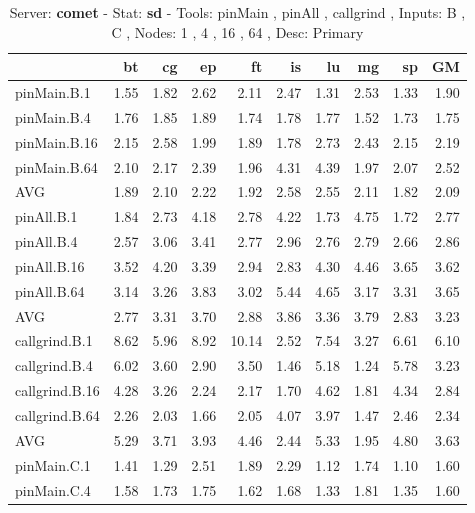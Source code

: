 \begin{table*}[]
\caption{Server: \textbf{comet} - 
 Stat: \textbf{sd} - 
 Tools: pinMain , pinAll , callgrind ,  
 Inputs: B , C ,  
 Nodes: 1 , 4 , 16 , 64 ,  
 Desc: Primary}
\label{comet_sd_pMpAcg_BC_itn_p3.5}\begin{center}
\begin{tabular}{lrrrrrrrrr}
\hline
                &   bt &   cg &    ep &    ft &   is &   lu &   mg &   sp &   GM \\
\hline
 pinMain.B.1    & 1.55 & 1.82 &  2.62 &  2.11 & 2.47 & 1.31 & 2.53 & 1.33 & 1.90 \\
 pinMain.B.4    & 1.76 & 1.85 &  1.89 &  1.74 & 1.78 & 1.77 & 1.52 & 1.73 & 1.75 \\
 pinMain.B.16   & 2.15 & 2.58 &  1.99 &  1.89 & 1.78 & 2.73 & 2.43 & 2.15 & 2.19 \\
 pinMain.B.64   & 2.10 & 2.17 &  2.39 &  1.96 & 4.31 & 4.39 & 1.97 & 2.07 & 2.52 \\
 AVG            & 1.89 & 2.10 &  2.22 &  1.92 & 2.58 & 2.55 & 2.11 & 1.82 & 2.09 \\
 pinAll.B.1     & 1.84 & 2.73 &  4.18 &  2.78 & 4.22 & 1.73 & 4.75 & 1.72 & 2.77 \\
 pinAll.B.4     & 2.57 & 3.06 &  3.41 &  2.77 & 2.96 & 2.76 & 2.79 & 2.66 & 2.86 \\
 pinAll.B.16    & 3.52 & 4.20 &  3.39 &  2.94 & 2.83 & 4.30 & 4.46 & 3.65 & 3.62 \\
 pinAll.B.64    & 3.14 & 3.26 &  3.83 &  3.02 & 5.44 & 4.65 & 3.17 & 3.31 & 3.65 \\
 AVG            & 2.77 & 3.31 &  3.70 &  2.88 & 3.86 & 3.36 & 3.79 & 2.83 & 3.23 \\
 callgrind.B.1  & 8.62 & 5.96 &  8.92 & 10.14 & 2.52 & 7.54 & 3.27 & 6.61 & 6.10 \\
 callgrind.B.4  & 6.02 & 3.60 &  2.90 &  3.50 & 1.46 & 5.18 & 1.24 & 5.78 & 3.23 \\
 callgrind.B.16 & 4.28 & 3.26 &  2.24 &  2.17 & 1.70 & 4.62 & 1.81 & 4.34 & 2.84 \\
 callgrind.B.64 & 2.26 & 2.03 &  1.66 &  2.05 & 4.07 & 3.97 & 1.47 & 2.46 & 2.34 \\
 AVG            & 5.29 & 3.71 &  3.93 &  4.46 & 2.44 & 5.33 & 1.95 & 4.80 & 3.63 \\
 pinMain.C.1    & 1.41 & 1.29 &  2.51 &  1.89 & 2.29 & 1.12 & 1.74 & 1.10 & 1.60 \\
 pinMain.C.4    & 1.58 & 1.73 &  1.75 &  1.62 & 1.68 & 1.33 & 1.81 & 1.35 & 1.60 \\

\end{tabular}
\end{center}
\end{table*}
